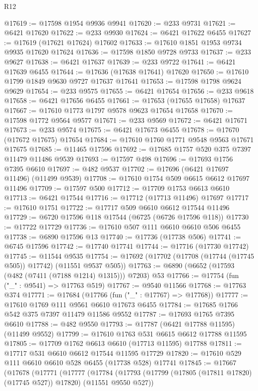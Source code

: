\begin{lexlean}{R12}
\begin{coremodule}
@17619 := @17598 @1954 @9936 @9941
@17620 := @233 @9731
@17621 := @6421 @17620
@17622 := @233 @9930
@17624 := @6421 @17622 @6455
@17627 := @17619 (@17621 @17624) @17602
@17633 := @17610 @1851 @1953 @9734 @9935 @17620 @17624
@17636 := @17598 @1850 @9728 @9733
@17637 := @233 @9627
@17638 := @6421 @17637
@17639 := @233 @9722
@17641 := @6421 @17639 @6455
@17644 := @17636 (@17638 @17641) @17620
@17650 := @17610 @1799 @1849 @9630 @9727 @17637 @17641
@17653 := @17598 @1798 @9624 @9629
@17654 := @233 @9575
@17655 := @6421 @17654
@17656 := @233 @9618
@17658 := @6421 @17656 @6455
@17661 := @17653 (@17655 @17658) @17637
@17667 := @17610 @1773 @1797 @9578 @9623 @17654 @17658
@17670 := @17598 @1772 @9564 @9577
@17671 := @233 @9569
@17672 := @6421 @17671
@17673 := @233 @9574
@17675 := @6421 @17673 @6455
@17678 := @17670 (@17672 @17675) @17654
@17684 := @17610 @1760 @1771 @9548 @9563 @17671 @17675
@17685 := @11465 @17596
@17692 := @17685 @1757 @520 @375 @7397 @11479 @11486 @9539
@17693 := @17597 @498
@17696 := @17693 @1756 @7395 @6610
@17697 := @482 @9537
@17702 := @17696 (@6421 @17697 @11496) (@11499 @9539)
@17708 := @17610 @1754 @509 @6615 @6612 @17697 @11496
@17709 := @17597 @500
@17712 := @17709 @1753 @6613 @6610
@17713 := @6421 @17544
@17716 := @17712 (@17713 @11496) @17697
@17717 := @17610 @1751
@17722 := @17717 @509 @6610 @6612 @17544 @11496
@17729 := @6720 @17596 @118 @17544 (@6725 (@6726 @17596 @118))
@17730 := @17722 @17729
@17736 := @17610 @507 @111 @6610 @6610 @506 @6455
@17738 := @6890 @17596 @13
@17740 := @17736 (@17738 @506)
@17741 := @6745 @17596
@17742 := @17740 @17741
@17744 := @17716 (@17730 @17742)
@17745 := @11544 @9535
@17754 := @17692 (@17702 (@17708 (@17744 (@17745 @505)) @17742) (@11551 @9537 @505))
@17763 := @6890 (@6652 (@17593 (@482 (@7411 (@7188 @1214) @1315))) @7203) @53
@17766 := @17754 (fun ("_" : @9541) => @17763 @519)
@17767 := @9540 @11566
@17768 := @17763 @374
@17771 := @17684 (@17766 (fun ("_" : @17767) => @17768))
@17777 := @17610 @1769 @111 @9561 @6610 @17673 @6455
@17784 := @17685 @1766 @542 @375 @7397 @11479 @11586 @9552
@17787 := @17693 @1765 @7395 @6610
@17788 := @482 @9550
@17793 := @17787 (@6421 @17788 @11595) (@11499 @9552)
@17799 := @17610 @1763 @531 @6615 @6612 @17788 @11595
@17805 := @17709 @1762 @6613 @6610 (@17713 @11595) @17788
@17811 := @17717 @531 @6610 @6612 @17544 @11595 @17729
@17820 := @17610 @529 @111 @6610 @6610 @528 @6455 (@17738 @528) @17741
@17845 := @17667
    (@17678
      (@17771
        (@17777
          (@17784
            (@17793 (@17799 (@17805 (@17811 @17820) (@17745 @527)) @17820) (@11551 @9550 @527))

\end{coremodule}
\end{lexlean}
